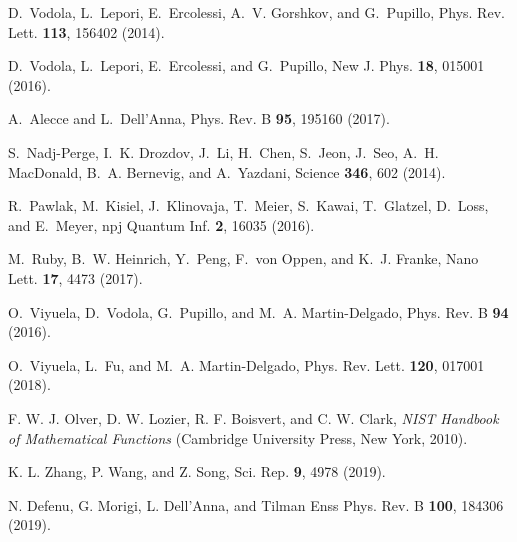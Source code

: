 \documentclass[pra,twocolumn,
superscriptaddress,
showpacs,
aps
]{revtex4-1}
\begin{document}
\begin{thebibliography}{66}
	
	D.~Vodola, L.~Lepori, E.~Ercolessi, A.~V. Gorshkov, and G.~Pupillo, Phys. Rev. Lett. \textbf{113}, 156402 (2014).
	
	D.~Vodola, L.~Lepori, E.~Ercolessi, and G.~Pupillo, New J. Phys. \textbf{18}, 015001 (2016).
	
	A.~Alecce and L.~Dell'Anna, Phys. Rev. B \textbf{95}, 195160 (2017).
	
	S.~Nadj-Perge, I.~K. Drozdov, J.~Li, H.~Chen, S.~Jeon, J.~Seo, A.~H. MacDonald,
	B.~A. Bernevig, and A.~Yazdani, Science \textbf{346}, 602 (2014).
	
	R.~Pawlak, M.~Kisiel, J.~Klinovaja, T.~Meier, S.~Kawai, T.~Glatzel, D.~Loss,
	and E.~Meyer, npj Quantum Inf. \textbf{2}, 16035 (2016).
	
	M.~Ruby, B.~W. Heinrich, Y.~Peng, F.~von Oppen, and K.~J. Franke, Nano Lett. \textbf{17}, 4473 (2017).
		
	O.~Viyuela, D.~Vodola, G.~Pupillo, and M.~A. Martin-Delgado, Phys. Rev. B \textbf{94} (2016).
	
	O.~Viyuela, L.~Fu, and M.~A. Martin-Delgado, Phys. Rev. Lett. \textbf{120}, 017001 (2018).
	
	F. W. J. Olver, D. W. Lozier, R. F. Boisvert, and C. W. Clark,
	\textit{NIST Handbook of Mathematical Functions} (Cambridge
	University Press, New York, 2010).
	
	K. L. Zhang, P. Wang, and Z. Song, Sci. Rep. {\bf9}, 4978 (2019).
	
	N. Defenu, G. Morigi, L. Dell'Anna, and Tilman Enss
	Phys. Rev. B {\bf 100}, 184306 (2019).
\end{thebibliography}
\end{document}
